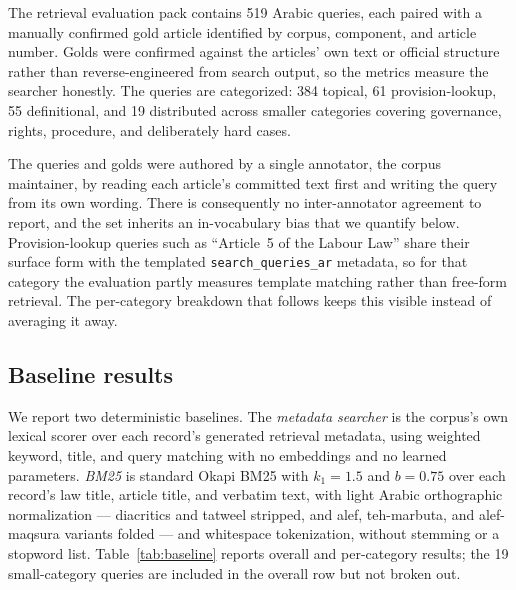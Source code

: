 \documentclass[sn-basic]{sn-jnl}%
\begin{document}
The retrieval evaluation pack contains 519 Arabic queries, each paired with
a manually confirmed gold article identified by corpus, component, and
article number. Golds were confirmed against the articles' own text or
official structure rather than reverse-engineered from search output, so the
metrics measure the searcher honestly. The queries are categorized: 384
topical, 61 provision-lookup, 55 definitional, and 19 distributed across
smaller categories covering governance, rights, procedure, and deliberately
hard cases.

The queries and golds were authored by a single annotator, the corpus
maintainer, by reading each article's committed text first and writing the
query from its own wording. There is consequently no inter-annotator
agreement to report, and the set inherits an in-vocabulary bias that we
quantify below. Provision-lookup queries such as ``Article~5 of the Labour
Law'' share their surface form with the templated
\texttt{search\_queries\_ar} metadata, so for that category the evaluation
partly measures template matching rather than free-form retrieval. The
per-category breakdown that follows keeps this visible instead of averaging
it away.

\subsection{Baseline results}

We report two deterministic baselines. The \emph{metadata searcher} is the
corpus's own lexical scorer over each record's generated retrieval metadata,
using weighted keyword, title, and query matching with no embeddings and no
learned parameters. \emph{BM25} is standard Okapi BM25 with $k_1 = 1.5$ and
$b = 0.75$ over each record's law title, article title, and verbatim text,
with light Arabic orthographic normalization --- diacritics and tatweel
stripped, and alef, teh-marbuta, and alef-maqsura variants folded --- and
whitespace tokenization, without stemming or a stopword list.
Table~\ref{tab:baseline} reports overall and per-category results; the 19
small-category queries are included in the overall row but not broken out.
\end{document}

